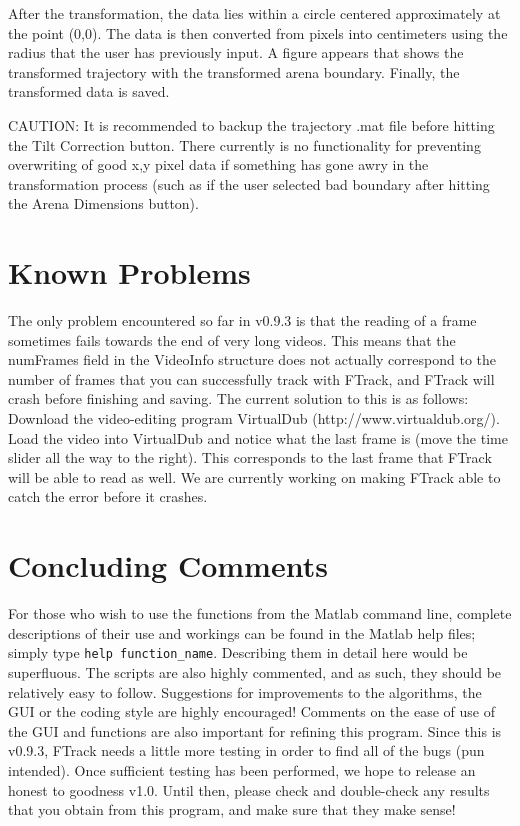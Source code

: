 \documentclass[letterpaper, 11pt]{article}
\begin{document}
After the transformation, the data lies within a circle centered approximately at the point (0,0).
The data is then converted from pixels into centimeters using the radius that the user has
previously input.  A figure appears that shows the transformed trajectory with the transformed
arena boundary. Finally, the transformed data is saved.

CAUTION: It is recommended to backup the trajectory .mat file before
hitting the Tilt Correction button.  There currently is no
functionality for preventing overwriting of good x,y pixel data if
something has gone awry in the transformation process (such as if
the user selected bad boundary after hitting the Arena Dimensions
button).

\section{Known Problems}
The only problem encountered so far in v0.9.3 is that the reading of a frame sometimes fails
towards the end of very long videos.  This means that the numFrames field in the VideoInfo
structure does not actually correspond to the number of frames that you can successfully track with
FTrack, and FTrack will crash before finishing and saving. The current solution to this is as
follows: Download the video-editing program VirtualDub (http://www.virtualdub.org/). Load the video
into VirtualDub and notice what the last frame is (move the time slider all the way to the right).
This corresponds to the last frame that FTrack will be able to read as well.  We are currently
working on making FTrack able to catch the error before it crashes.

\section{Concluding Comments}
For those who wish to use the functions from the Matlab command line, complete descriptions of
their use and workings can be found in the Matlab help files; simply type \texttt{help
function\_name}. Describing them in detail here would be superfluous.  The scripts are also highly
commented, and as such, they should be relatively easy to follow. Suggestions for improvements to
the algorithms, the GUI or the coding style are highly encouraged!  Comments on the ease of use of
the GUI and functions are also important for refining this program.  Since this is v0.9.3, FTrack
needs a little more testing in order to find all of the bugs (pun intended).  Once sufficient
testing has been performed, we hope to release an honest to goodness v1.0.  Until then, please
check and double-check any results that you obtain from this program, and make sure that they make
sense! \\
\end{document}
